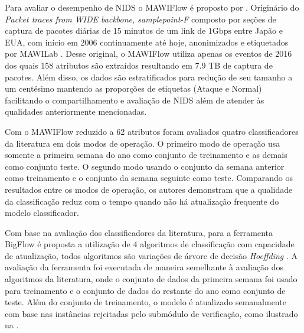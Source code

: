Para avaliar o desempenho de NIDS o \dataset MAWIFlow é proposto por .
Originário do
\dataset \emph{Packet traces from WIDE backbone, samplepoint-F} composto por
seções de captura de pacotes diárias de 15 minutos de um link de $1
\mathrm{Gbps}$ entre Japão e EUA, com início em 2006 continuamente até hoje,
anonimizados e etiquetados por MAWILab \cite{mawiSamplepointF,Fontugne2010}.
Desse \dataset original, o \dataset MAWIFlow utiliza apenas os eventos de 2016
dos quais 158 atributos são extraídos resultando em 7.9 TB de captura de pacotes.
Além disso, os dados são estratificados para redução de seu tamanho a um
centésimo mantendo as proporções de etiquetas (Ataque e Normal) facilitando o
compartilhamento e avaliação de NIDS além de atender às qualidades anteriormente
mencionadas.


Com o \dataset MAWIFlow reduzido a 62 atributos foram avaliados quatro
classificadores da literatura em dois modos de operação.
O primeiro modo de operação usa somente a primeira semana do ano como conjunto
de treinamento e as demais como conjunto teste.
O segundo modo usando o conjunto da semana anterior como treinamento e o
conjunto da semana seguinte como teste.
Comparando os resultados entre os modos de operação, os autores demonstram que a qualidade da
classificação reduz com o tempo quando não há atualização frequente do modelo
classificador.

Com base na avaliação dos classificadores da literatura, para a ferramenta
BigFlow é proposta a utilização de 4 algoritmos de classificação com capacidade
de atualização, todos algoritmos são variações de árvore de decisão
\emph{Hoeffding} \cite{Viegas2019,Domingos2000}.
A avaliação da ferramenta foi executada de maneira semelhante à avaliação
dos algoritmos da literatura, onde o conjunto de dados da primeira semana foi
usado para treinamento e o conjunto de dados do restante do ano como conjunto
de teste.
Além do conjunto de treinamento, o modelo é atualizado semanalmente com base nas
instâncias rejeitadas pelo submódulo de verificação, como ilustrado na
.


